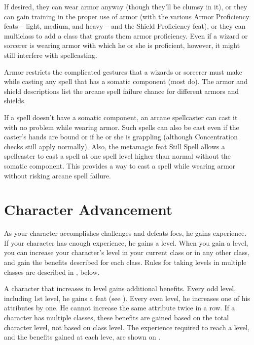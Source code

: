 If desired, they can wear armor anyway (though they'll be clumsy in it), or they can gain training in the proper use of armor (with the various Armor Proficiency feats -- light, medium, and heavy -- and the Shield Proficiency feat), or they can multiclass to add a class that grants them armor proficiency. Even if a wizard or sorcerer is wearing armor with which he or she is proficient, however, it might still interfere with spellcasting.

Armor restricts the complicated gestures that a wizards or sorcerer must make while casting any spell that has a somatic component (most do). The armor and shield descriptions list the arcane spell failure chance for different armors and shields.

If a spell doesn't have a somatic component, an arcane spellcaster can cast it with no problem while wearing armor. Such spells can also be cast even if the caster's hands are bound or if he or she is grappling (although Concentration checks still apply normally). Also, the metamagic feat Still Spell allows a spellcaster to cast a spell at one spell level higher than normal without the somatic component. This provides a way to cast a spell while wearing armor without risking arcane spell failure.

\section{Character Advancement}

As your character accomplishes challenges and defeats foes, he gains experience. If your character has enough experience, he gains a level. When you gain a level, you can increase your character's level in your current class or in any other class, and gain the benefits described for each class. Rules for taking levels in multiple classes are described in , below.

A character that increases in level gains additional benefits. Every odd level, including 1st level, he gains a feat (see ). Every even level, he increases one of his attributes by one. He cannot increase the same attribute twice in a row. If a character has multiple classes, these benefits are gained based on the total character level, not based on class level. The experience required to reach a level, and the benefits gained at each leve, are shown on .


